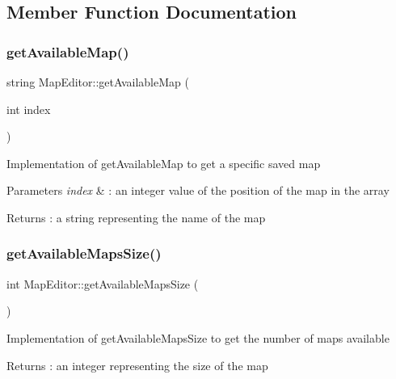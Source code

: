 \subsection{Member Function Documentation}
\hypertarget{class_map_editor_a8aae2a9a39abc032084926d3bfa69980}{}\label{class_map_editor_a8aae2a9a39abc032084926d3bfa69980} 
\subsubsection{\texorpdfstring{get\+Available\+Map()}{getAvailableMap()}}
{\footnotesize\ttfamily string Map\+Editor\+::get\+Available\+Map (\begin{DoxyParamCaption}\item[{int}]{index }\end{DoxyParamCaption})}

Implementation of get\+Available\+Map to get a specific saved map 
\begin{DoxyParams}{Parameters}
{\em index} & \+: an integer value of the position of the map in the array \\
\hline
\end{DoxyParams}
\begin{DoxyReturn}{Returns}
\+: a string representing the name of the map 
\end{DoxyReturn}
\hypertarget{class_map_editor_a5bd8ac96b712380197b274de67bbb81e}{}\label{class_map_editor_a5bd8ac96b712380197b274de67bbb81e} 
\subsubsection{\texorpdfstring{get\+Available\+Maps\+Size()}{getAvailableMapsSize()}}
{\footnotesize\ttfamily int Map\+Editor\+::get\+Available\+Maps\+Size (\begin{DoxyParamCaption}{ }\end{DoxyParamCaption})}

Implementation of get\+Available\+Maps\+Size to get the number of maps available \begin{DoxyReturn}{Returns}
\+: an integer representing the size of the map 
\end{DoxyReturn}
\hypertarget{class_map_editor_a9ba798e6bed9b9ccad9176e39a776c31}{}\label{class_map_editor_a9ba798e6bed9b9ccad9176e39a776c31} 
